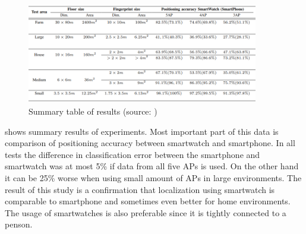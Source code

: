 \begin{figure}[H]
	\begin{centering}
		\includegraphics[width=0.9\textwidth]{img/smartwatch_vs_smartphone}
		\par\end{centering}
	\caption{Summary table of results (source: \cite{SWvsSP})\label{fig:SWvsSP}}
	\label{fig8}
\end{figure}

 shows summary results of experiments. Most important part of this data is comparison of positioning accuracy between smartwatch and smartphone. In all tests the difference in classification error between the smartphone and smartwatch was at most 5\% if data from all five APs is used. On the other hand it can be 25\% worse when using small amount of APs in large environments. The result of this study is a confirmation that localization using smartwatch is comparable to smartphone and sometimes even better for home environments. The usage of smartwatches is also preferable since it is tightly connected to a penson.

